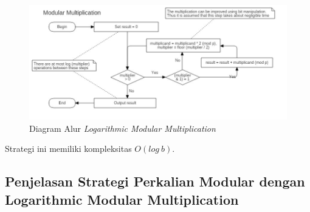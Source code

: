 \begin{figure}
	\Centering
	\includegraphics[angle=90,scale=0.5]{bab2/img/modular-multiplication}
	\caption{Diagram Alur \textit{Logarithmic Modular Multiplication}}
	\label{fig:log_mod_mul}
\end{figure}

Strategi ini memiliki kompleksitas $ O(log\ b) $.

\subsection{ Penjelasan Strategi Perkalian Modular dengan Logarithmic Modular Multiplication}

